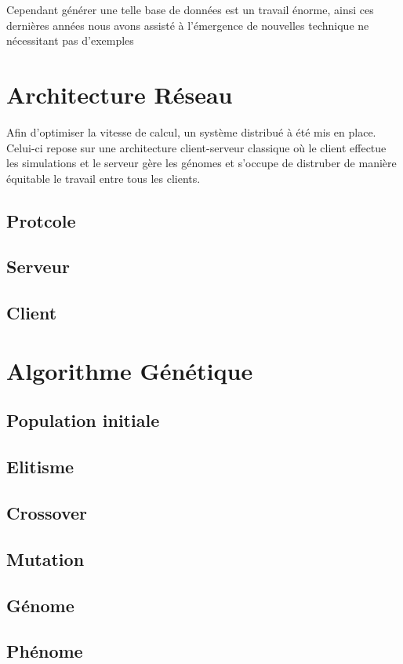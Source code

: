 \documentclass{article}
\begin{document}
Cependant générer une telle base de données est un travail énorme, ainsi ces dernières années nous avons assisté à l'émergence de nouvelles technique ne nécessitant pas d'exemples

\section{Architecture Réseau}

Afin d'optimiser la vitesse de calcul, un système distribué à été mis en place. Celui-ci repose sur une architecture client-serveur classique où le client effectue les simulations et le serveur gère les génomes et s'occupe de distruber de manière équitable le travail entre tous les clients.\\


\subsection{Protcole}
\subsection{Serveur}
\subsection{Client}

\section{Algorithme Génétique}
\subsection{Population initiale}
\subsection{Elitisme}
\subsection{Crossover}
\subsection{Mutation}
\subsection{Génome}
\subsection{Phénome}
\end{document}
